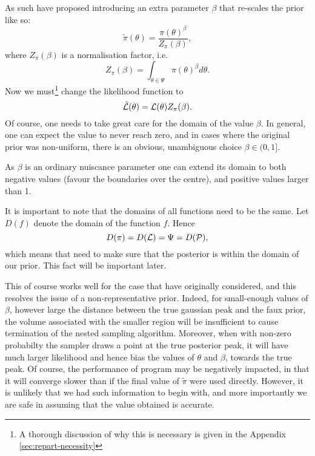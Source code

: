 \documentclass[usenatbib]{mnras}
\begin{document}
As such \citeauthor{chen-ferroz-hobson} have proposed introducing an
extra parameter \(\beta\) that re-scales the prior like so:
\begin{equation}
  \tilde{\pi}(\theta) = \frac{\pi(\theta)^{\beta}}{Z_{\pi}(\beta)},
\end{equation}
where \(Z_\pi(\beta)\) is a normalisation factor, i.e. 
\begin{equation}
  Z_{\pi}(\beta) = \int_{\theta \in \Psi} \pi(\theta)^{\beta}d\theta.
\end{equation}
Now we must\footnote{A thorough discussion of why this is necessary is given in the Appendix \autoref{sec:repart-necessity}} change the likelihood function to 
\begin{equation}
  \tilde{\cal L}(\theta) = {\cal L}(\theta) Z_{\pi}(\beta).
\end{equation}
Of course, one needs to take great care for the domain of the value
\(\beta\). In general, one can expect the value to never reach
zero, and in cases where the original prior was non-uniform, there
is an obvious, unambiguous choice \(\beta \in (0, 1]\). 

As \(\beta\) is an ordinary nuiscance parameter one can extend its
domain to both negative values (favour the boundaries over the
centre), and positive values larger than 1.

It is important to note that the domains of all functions need to
be the same. Let \(D(f)\) denote the domain of the function
\(f\). Hence 
\begin{equation}
  D(\pi) = D({\cal L}) = \Psi = D({\cal P}),
\end{equation} 
which means that need to make sure that the posterior is within the
domain of our prior. This fact will be important later.\label{domain-discussion}

This of course works well for the case that
\citeauthor{chen-ferroz-hobson} have originally considered, and this
resolves the issue of a non-representative prior. Indeed, for
small-enough values of \(\beta\), however large the distance
between the true gaussian peak and the faux prior, the volume
associated with the smaller region will be insufficient to cause
termination of the nested sampling algorithm. Moreover, when with
non-zero probabilty the sampler draws a point at the true posterior
peak, it will have much larger likelihood and hence bias the values
of \(\theta\) and \(\beta\), towards the true peak. Of course, the
performance of program may be negatively impacted, in that it will
converge slower than if the final value of \(\tilde{\pi}\) were
used directly. However, it is unlikely that we had such information
to begin with, and more importantly we are safe in assuming that
the value obtained is accurate.
\end{document}
